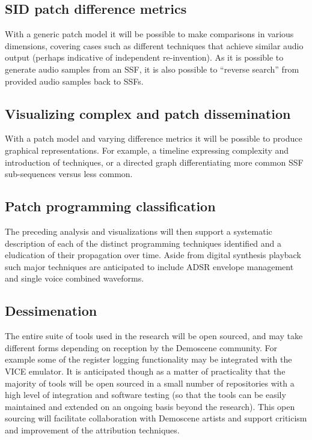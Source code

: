 \documentclass[10pt]{article}
\begin{document}
\begin{multicols*}{2}
  \subsection{SID patch difference metrics}
  With a generic patch model it will be possible to make comparisons
  in various dimensions, covering cases such as different techniques
  that achieve similar audio output (perhaps indicative of
  independent re-invention). As it is possible to generate audio
  samples from an SSF, it is also possible to ``reverse search'' from
  provided audio samples back to SSFs.

  \subsection{Visualizing complex and patch dissemination}
  With a patch model and varying difference metrics it will be
  possible to produce graphical representations. For example, a
  timeline expressing complexity and introduction of techniques,
  or a directed graph differentiating more common SSF sub-sequences
  versus less common.

  \subsection{Patch programming classification}
  The preceding analysis and visualizations will then support
  a systematic description of each of the distinct programming
  techniques identified and a eludication of their propagation
  over time. Aside from digital synthesis playback such major
  techniques are anticipated to include ADSR envelope
  management and single voice combined waveforms.

  \subsection{Dessimenation}
  The entire suite of tools used in the research will be open sourced,
  and may take different forms depending on reception by the Demoscene
  community. For example some of the register logging functionality
  may be integrated with the VICE emulator. It is anticipated though
  as a matter of practicality that the majority of tools will be open
  sourced in a small number of repositories with a high level of
  integration and software testing (so that the tools can be easily
  maintained and extended on an ongoing basis beyond the research).
  This open sourcing will facilitate collaboration with Demoscene
  artists and support criticism and improvement of the attribution
  techniques.


\end{multicols*}
\end{document}
